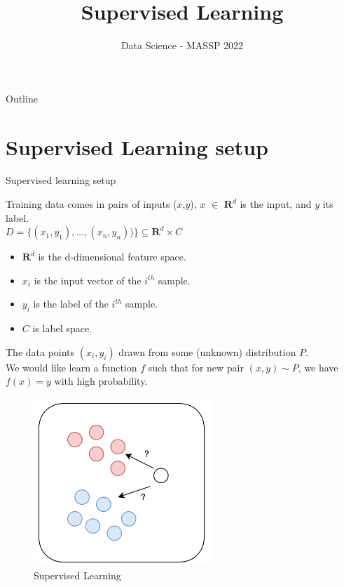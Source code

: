 \documentclass[aspectratio=1610]{beamer}
\title{Supervised Learning}
\author{Data Science - MASSP 2022}
\date{}
\begin{document}
\begin{frame}[plain]
  \titlepage
\end{frame}


\begin{frame}{Outline}
  \tableofcontents
  \end{frame}

\section{Supervised Learning setup}

\begin{frame}{Supervised learning setup}

\begin{minipage}{0.6\textwidth}
Training data comes in pairs of inputs ($x$,$y$), $x$ $\in$ $\mathbf{R}^d$ is the input, and $y$ its label.\\
$D = \{(x_1,y_1), ..., (x_n,y_n))\} \subseteq \mathbf{R}^d \times C$
  \begin{itemize}
      \item $\mathbf{R}^d$ is the d-dimensional feature space.
      \item $x_i$ is the input vector of the $i^{th}$ sample.
      \item $y_i$ is the label of the $i^{th}$ sample.
      \item $C$ is label space.
  \end{itemize}
  The data points $(x_i,y_i)$ drawn from some (unknown) distribution $P$.\\ We would like learn a function $f$ such that for new pair $(x,y) \sim P$, we have $f(x) = y$ with high probability.
  
\end{minipage}
\begin{minipage}{0.35\textwidth}
    \begin{figure}[h!]
  \includegraphics[width=0.6\textwidth]{supervised_learning_setup.png}
  \caption{Supervised Learning}
  \label{fig2}
\end{figure}
\end{minipage}


\end{frame}
\end{document}
